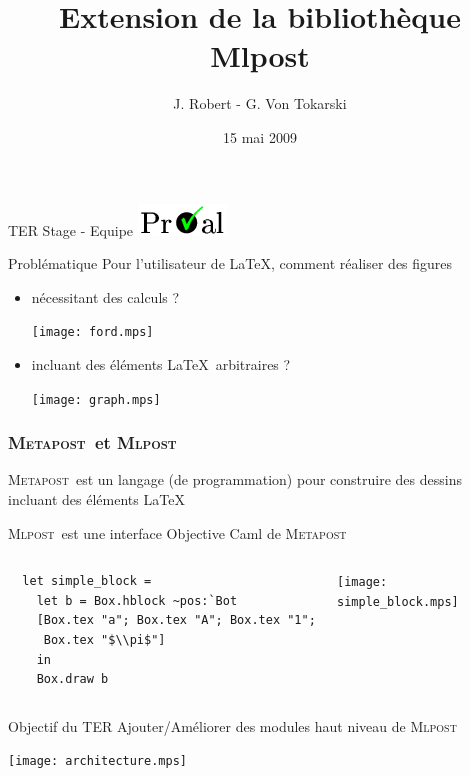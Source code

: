\documentclass{beamer}
\title{Extension de la bibliothèque Mlpost}
\author{J. Robert - G. Von Tokarski}
\date{15 mai 2009}
\newcommand{\mlpost}{\textsc{Mlpost}}
\newcommand{\meta}{\textsc{Metapost}}
\begin{document}
\begin{frame}
  \maketitle

  \begin{center}
    TER Stage - Equipe \includegraphics[scale=0.4]{proval.png}
  \end{center}
\end{frame}

\begin{frame}{Problématique}
  Pour l'utilisateur de \LaTeX, comment réaliser des figures
  \begin{itemize}
  \item nécessitant des calculs ?
  \begin{center}
    \texttt{[image: ford.mps]}
  \end{center}

  \bigskip
  \item incluant des éléments \LaTeX\ arbitraires ?
    \bigskip
    \begin{center}
      \texttt{[image: graph.mps]}
    \end{center}
  \end{itemize}
\end{frame}

\begin{frame}[fragile]\frametitle{\meta\ et \mlpost}
  \meta\ est un langage (de programmation) pour construire des dessins incluant des éléments \LaTeX

  \bigskip
  \mlpost\ est une interface Objective Caml de \meta

  \bigskip
  \begin{columns}
    \small
    \begin{verbatim}
  let simple_block =
    let b = Box.hblock ~pos:`Bot 
    [Box.tex "a"; Box.tex "A"; Box.tex "1"; 
     Box.tex "$\\pi$"] 
    in
    Box.draw b
    \end{verbatim}
    \texttt{[image: simple\_block.mps]}
  \end{columns}
\end{frame}


\begin{frame}{Objectif du TER}
  Ajouter/Améliorer des modules haut niveau de \mlpost

  \vfill
  \begin{center}
    \texttt{[image: architecture.mps]}
  \end{center}

\end{frame}
\end{document}
